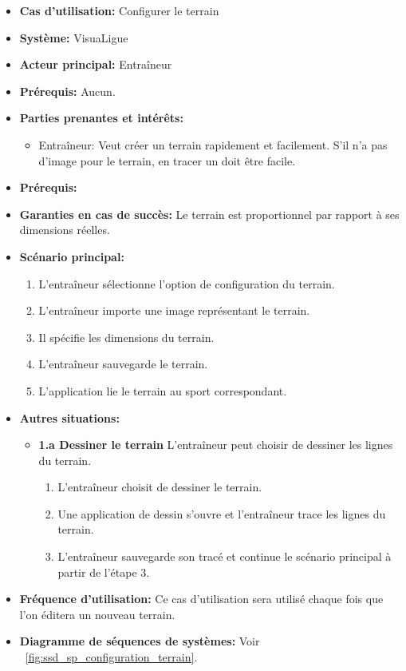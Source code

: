 \begin{itemize}
    \item \textbf{Cas d'utilisation:} Configurer le terrain
    \item \textbf{Syst\`eme:} VisuaLigue
    \item \textbf{Acteur principal:} Entra\^ineur
    \item \textbf{Pr\'erequis:} Aucun.
    \item \textbf{Parties prenantes et int\'er\^ets:}
        \begin{itemize}
            \item Entraîneur: Veut créer un terrain rapidement et facilement. S'il n'a pas d'image pour le terrain, en tracer un doit être facile.
        \end{itemize}
    \item \textbf{Pr\'erequis:}
    \item \textbf{Garanties en cas de succ\`es:} Le terrain est proportionnel par rapport à ses dimensions réelles.
    \item \textbf{Sc\'enario principal:}
        \begin{enumerate}
            \item L'entraîneur sélectionne l'option de configuration du terrain.
            \item L'entraîneur importe une image représentant le terrain.
            \item Il spécifie les dimensions du terrain.
            \item L'entraîneur sauvegarde le terrain.
            \item L'application lie le terrain au sport correspondant.
        \end{enumerate}
    \item \textbf{Autres situations:}
        \begin{itemize}
            \item \textbf{1.a Dessiner le terrain} L'entraîneur peut choisir de dessiner les lignes du terrain.
                \begin{enumerate}
                    \item L'entraîneur choisit de dessiner le terrain.
                    \item Une application de dessin s'ouvre et l'entraîneur trace les lignes du terrain.
                    \item L'entraîneur sauvegarde son tracé et continue le scénario principal à partir de l'étape 3.
                \end{enumerate}

        \end{itemize}
    \item \textbf{Fréquence d'utilisation:} Ce cas d'utilisation sera utilisé chaque fois que l'on éditera un nouveau terrain.
    \item \textbf{Diagramme de s\'equences de systèmes:} Voir ~\ref{fig:ssd_sp_configuration_terrain}.
\end{itemize}

